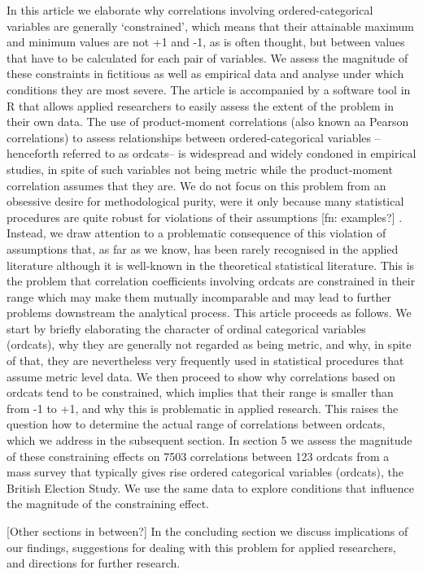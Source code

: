 \documentclass[
  12pt,
]{article}
\theoremstyle{plain}
\theoremstyle{definition}
\theoremstyle{remark}
\begin{document}
In this article we elaborate why correlations involving
ordered-categorical variables are generally `constrained', which means
that their attainable maximum and minimum values are not +1 and -1, as
is often thought, but between values that have to be calculated for each
pair of variables. We assess the magnitude of these constraints in
fictitious as well as empirical data and analyse under which conditions
they are most severe. The article is accompanied by a software tool in R
that allows applied researchers to easily assess the extent of the
problem in their own data. The use of product-moment correlations (also
known aa Pearson correlations) to assess relationships between
ordered-categorical variables --henceforth referred to as ordcats-- is
widespread and widely condoned in empirical studies, in spite of such
variables not being metric while the product-moment correlation assumes
that they are. We do not focus on this problem from an obsessive desire
for methodological purity, were it only because many statistical
procedures are quite robust for violations of their assumptions {[}fn:
examples?{]} . Instead, we draw attention to a problematic consequence
of this violation of assumptions that, as far as we know, has been
rarely recognised in the applied literature although it is well-known in
the theoretical statistical literature. This is the problem that
correlation coefficients involving ordcats are constrained in their
range which may make them mutually incomparable and may lead to further
problems downstream the analytical process. This article proceeds as
follows. We start by briefly elaborating the character of ordinal
categorical variables (ordcats), why they are generally not regarded as
being metric, and why, in spite of that, they are nevertheless very
frequently used in statistical procedures that assume metric level data.
We then proceed to show why correlations based on ordcats tend to be
constrained, which implies that their range is smaller than from -1 to
+1, and why this is problematic in applied research. This raises the
question how to determine the actual range of correlations between
ordcats, which we address in the subsequent section. In section 5 we
assess the magnitude of these constraining effects on 7503 correlations
between 123 ordcats from a mass survey that typically gives rise ordered
categorical variables (ordcats), the British Election Study. We use the
same data to explore conditions that influence the magnitude of the
constraining effect.

{[}Other sections in between?{]} In the concluding section we discuss
implications of our findings, suggestions for dealing with this problem
for applied researchers, and directions for further research.
\end{document}
